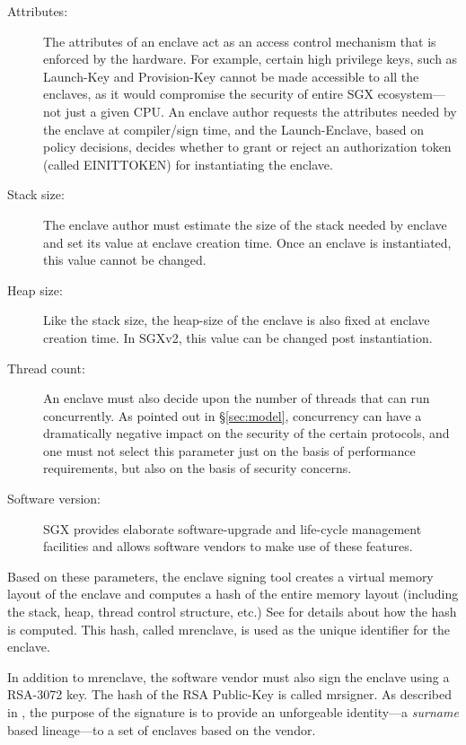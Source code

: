 \documentclass[10pt, letterpaper]{article}
\newcommand{\secref}[1]{\S\ref{#1}}
\newcommand{\mrenclave}{\textsf{mrenclave}}
\newcommand{\mrsigner}{\textsf{mrsigner}}
\begin{document}
  \begin{description}
  \item[Attributes:] The attributes of an enclave act as an access
    control mechanism that is enforced by the hardware. For example,
    certain high privilege keys, such as Launch-Key and Provision-Key
    cannot be made accessible to all the enclaves, as it would
    compromise the security of entire SGX ecosystem---not just a given
    CPU. An enclave author requests the attributes needed by the
    enclave at compiler/sign time, and the Launch-Enclave, based on
    policy decisions, decides whether to grant or reject an
    authorization token (called \textsf{EINITTOKEN}) for instantiating
    the enclave.

  \item[Stack size:] The enclave author must estimate the size of the
    stack needed by enclave and set its value at enclave creation
    time. Once an enclave is instantiated, this value cannot be
    changed.

  \item[Heap size:] Like the stack size, the heap-size of the enclave
    is also fixed at enclave creation time. In SGXv2, this value can
    be changed post instantiation.

  \item[Thread count:] An enclave must also decide upon the number of
    threads that can run concurrently. As pointed out in
    \secref{sec:model}, concurrency can have a dramatically negative
    impact on the security of the certain protocols, and one must not
    select this parameter just on the basis of performance
    requirements, but also on the basis of security concerns.

  \item[Software version:] SGX provides elaborate software-upgrade
    and life-cycle management facilities and allows software vendors
    to make use of these features.

  \end{description}

  Based on these parameters, the enclave signing tool creates a
  virtual memory layout of the enclave and computes a hash of the
  entire memory layout (including the stack, heap, thread control
  structure, etc.)  See \cite{intelsdm} for details about how the hash
  is computed. This hash, called \mrenclave, is used as the unique
  identifier for the enclave.

  In addition to \textsf{mrenclave}, the software vendor must also
  sign the enclave using a RSA-3072 key. The hash of the RSA
  Public-Key is called \mrsigner. As described in \cite{surnaming},
  the purpose of the signature is to provide an unforgeable
  identity---a \textit{surname} based lineage---to a set of enclaves
  based on the vendor.
\end{document}
